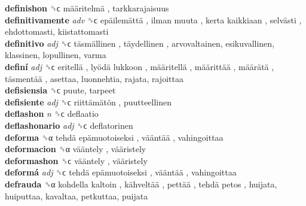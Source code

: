 \textbf{definishon} ␝ϲ   määritelmä , tarkkarajaisuus  \\
\textbf{definitivamente} \emph{adv}  ␝ϲ   epäilemättä ,  ilman muuta ,  kerta kaikkiaan ,  selvästi , ehdottomasti, kiistattomasti  \\
\textbf{definitivo} \emph{adj}  ␝ϲ   täsmällinen ,  täydellinen , arvovaltainen, esikuvallinen, klassinen, lopullinen, varma  \\
\textbf{definí} \emph{adj}  ␝ϲ   eritellä ,  lyödä lukkoon ,  määritellä ,  määrittää ,  määrätä ,  täsmentää , asettaa, luonnehtia, rajata, rajoittaa  \\
\textbf{defisiensia} ␝ϲ  puute, tarpeet  \\
\textbf{defisiente} \emph{adj}  ␝ϲ   riittämätön , puutteellinen  \\
\textbf{deflashon} \emph{n}  ␝ϲ  deflaatio  \\
\textbf{deflashonario} \emph{adj}  ␝ϲ  deflatorinen  \\
\textbf{deforma} ␝α   tehdä epämuotoiseksi ,  vääntää , vahingoittaa  \\
\textbf{deformacion} ␝α   vääntely ,  vääristely   \\
\textbf{deformashon} ␝ϲ   vääntely ,  vääristely   \\
\textbf{deformá} \emph{adj}  ␝ϲ   tehdä epämuotoiseksi ,  vääntää , vahingoittaa  \\
\textbf{defrauda} ␝α   kohdella kaltoin ,  kähveltää ,  pettää ,  tehdä petos , huijata, huiputtaa, kavaltaa, petkuttaa, puijata  \\
